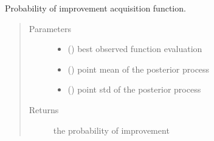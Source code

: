 \documentclass[letterpaper,10pt,english]{sphinxmanual}
\begin{document}
\begin{fulllineitems}
\begin{fulllineitems}
\begin{quote}
\begin{description}
\end{description}\end{quote}

\end{fulllineitems}


\begin{fulllineitems}
\label{\detokenize{index:bo.acquisition.Acquisition.probability_improvement}}
Probability of improvement acquisition function.
\begin{quote}\begin{description}
\item[{Parameters}] \leavevmode\begin{itemize}
\item {} 
 () \textendash{} best observed function evaluation

\item {} 
 () \textendash{} point mean of the posterior process

\item {} 
 () \textendash{} point std of the posterior process

\end{itemize}

\item[{Returns}] \leavevmode
the probability of improvement

\end{description}\end{quote}

\end{fulllineitems}


\end{fulllineitems}

\label{\detokenize{index:module-bo.bo}}
\end{document}
